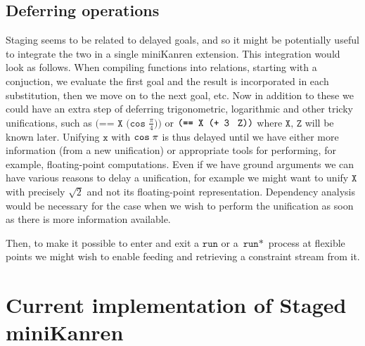 \documentclass[11pt]{article}
\theoremstyle{definition}
\newcommand{\code}[1]{\texttt{#1}}
\newcommand\tab[1][1cm]{\hspace*{#1}}
\begin{document}
\subsection{Deferring operations}
\tab Staging seems to be related to delayed goals, and so it might be potentially useful to integrate the two in a single miniKanren extension. This integration would look as follows. When compiling functions into relations, starting with a conjuction, we evaluate the first goal and the result is incorporated in each substitution, then we move on to the next goal, etc. Now in addition to these we could have an extra step of deferring trigonometric, logarithmic and other tricky unifications, such as $\code{(== X (cos }{\frac{\pi}{4}\code{))}}$ or $\code{(== X (+ 3} \hspace{0.3cm}\code{Z))}$ where $\code{X, Z}$ will be known later. Unifying $\code{x}$ with $\texttt{cos} \hspace{0.1cm}\pi$ is thus delayed until we have either more information (from a new unification) or appropriate tools for performing, for example, floating-point computations. Even if we have ground arguments we can have various reasons to delay a unification, for example we might want to unify $\code{X}$ with precisely $\sqrt{2}$ and not its floating-point representation. Dependency analysis would be necessary for the case when we wish to perform the unification as soon as there is more information available.

Then, to make it possible to enter and exit a $\code{run}$ or a $\code{run}*$  process at flexible points we might wish to enable feeding and retrieving a constraint stream from it. 


\section{Current implementation of Staged miniKanren}
\end{document}

